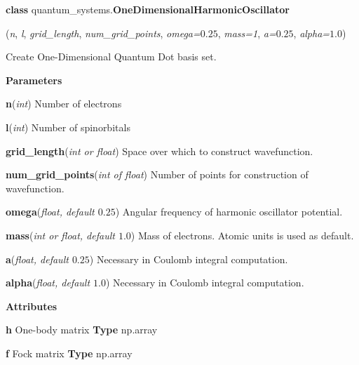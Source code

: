 
\begin{tcolorbox}
    {\selectfont
    \textbf{class} quantum\_systems.\textbf{OneDimensionalHarmonicOscillator}

    \hspace{1em}(\emph{n}, \emph{l}, \emph{grid\_length}, \emph{num\_grid\_points}, 
    \emph{omega=$0.25$}, \emph{mass=1}, \emph{a=$0.25$}, \emph{alpha=$1.0$})

    \vspace{1em}
    Create One-Dimensional Quantum Dot basis set.
    \vspace{1em}

    \textbf{Parameters}

    \hspace{2em}\textbf{n}(\emph{int}) Number of electrons
    
    \hspace{2em}\textbf{l}(\emph{int}) Number of spinorbitals
    
    \hspace{2em}\textbf{grid\_length}(\emph{int or float}) Space over which to 
        construct wavefunction.
    
    \hspace{2em}\textbf{num\_grid\_points}(\emph{int of float}) Number of 
        points for construction of wavefunction.

    \hspace{2em}\textbf{omega}(\emph{float, default $0.25$}) Angular frequency of
        harmonic oscillator potential.
    
    \hspace{2em}\textbf{mass}(\emph{int or float, default $1.0$}) Mass of electrons.
        Atomic units is used as default.
    
    \hspace{2em}\textbf{a}(\emph{float, default $0.25$}) Necessary in Coulomb 
        integral computation.
    
    \hspace{2em}\textbf{alpha}(\emph{float, default $1.0$}) Necessary in Coulomb 
        integral computation.

    \vspace{1em}
    \textbf{Attributes}

    \hspace{2em} \textbf{h}
    One-body matrix 
    \textbf{Type} np.array
    
    \hspace{2em} \textbf{f}
    Fock matrix
    \textbf{Type} np.array

}
\end{tcolorbox}
